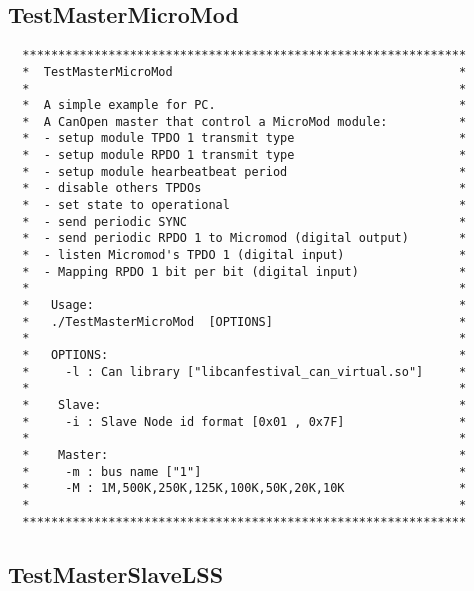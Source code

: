\documentclass[12pt,english,a4paper]{book}
\begin{document}
\bigskip{}



\subsection{TestMasterMicroMod }



\begin{verbatim}
  **************************************************************
  *  TestMasterMicroMod                                        *
  *                                                            *
  *  A simple example for PC.                                  *
  *  A CanOpen master that control a MicroMod module:          *
  *  - setup module TPDO 1 transmit type                       *
  *  - setup module RPDO 1 transmit type                       *
  *  - setup module hearbeatbeat period                        *
  *  - disable others TPDOs                                    *
  *  - set state to operational                                *
  *  - send periodic SYNC                                      *
  *  - send periodic RPDO 1 to Micromod (digital output)       *
  *  - listen Micromod's TPDO 1 (digital input)                *
  *  - Mapping RPDO 1 bit per bit (digital input)              *
  *                                                            *
  *   Usage:                                                   *
  *   ./TestMasterMicroMod  [OPTIONS]                          *
  *                                                            *
  *   OPTIONS:                                                 *
  *     -l : Can library ["libcanfestival_can_virtual.so"]     *
  *                                                            *
  *    Slave:                                                  *
  *     -i : Slave Node id format [0x01 , 0x7F]                *
  *                                                            *
  *    Master:                                                 *
  *     -m : bus name ["1"]                                    *
  *     -M : 1M,500K,250K,125K,100K,50K,20K,10K                *
  *                                                            *
  **************************************************************
\end{verbatim}

\subsection{TestMasterSlaveLSS}
\end{document}
